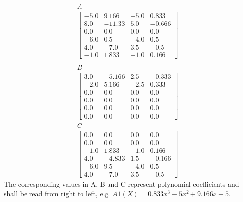 \begin{align*}
    A \\
    \begin{bmatrix}
        -5.0 & 9.166 & -5.0 & 0.833 \\
        8.0 & -11.33 & 5.0 & -0.666 \\
        0.0 & 0.0 & 0.0 & 0.0 \\
        -6.0 & 0.5 & -4.0 & 0.5 \\
        4.0 & -7.0 & 3.5 & -0.5 \\
        -1.0 & 1.833 & -1.0 & 0.166
    \end{bmatrix} \\
\end{align*}
\begin{align*}
        B \\
    \begin{bmatrix}
        3.0 & -5.166 & 2.5 & -0.333 \\
        -2.0 & 5.166 & -2.5 & 0.333 \\
        0.0 & 0.0 & 0.0 & 0.0 \\
        0.0 & 0.0 & 0.0 & 0.0 \\
        0.0 & 0.0 & 0.0 & 0.0 \\
        0.0 & 0.0 & 0.0 & 0.0
    \end{bmatrix}
\end{align*}
\begin{align*}
        C \\
    \begin{bmatrix}
        0.0 & 0.0 & 0.0 & 0.0 \\
        0.0 & 0.0 & 0.0 & 0.0 \\
        -1.0 & 1.833 & -1.0 & 0.166 \\
        4.0 & -4.833 & 1.5 & -0.166 \\
        -6.0 & 9.5 & -4.0 & 0.5 \\
        4.0 & -7.0 & 3.5 & -0.5
    \end{bmatrix}
\end{align*}
The corresponding values in A, B and C represent polynomial coefficients and shall be read from right to left, e.g. \(A1(X) = 0.833x^3 - 5x^2 + 9.166x -5\).

